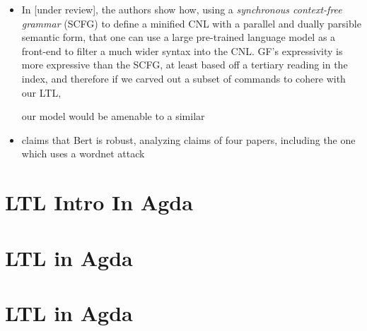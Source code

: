 \documentclass{article}
\begin{document}
\begin{itemize}

\item In \cite{fewShotSem} [under review], the authors show how, using a \emph{synchronous
context-free grammar} (SCFG) to define a minified CNL with a parallel and dually
parsible semantic form, that one can use a large pre-trained language model as a front-end
to filter a much wider syntax into the CNL. GF's expressivity is
more expressive than the SCFG, at least based off a tertiary reading in the
index, and therefore if we carved out a subset of commands to cohere with our
LTL,

our model would be amenable to a similar

\item  \cite{hauser2021bert}  claims that Bert is robust, analyzing claims of four
 papers, including the one which uses a wordnet attack

\end{itemize}

\section{LTL Intro In Agda}
\section{LTL in Agda}




\section{LTL in Agda}
\end{document}
